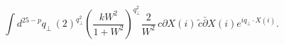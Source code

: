 \begin{equation}
  \int d^{25-p}q_{\bot}\,
(2)^{q_{\bot}^2}
\left(\frac{k W^2}{1+W^2}\right)^{q_{\bot}^2} \frac{2}{W^2}
  \, c\partial X(i)\, \tilde{c} \bar{\partial} X(i)
e^{iq_{\bot}\cdot X(i)} .
\end{equation}

